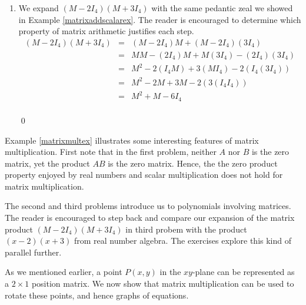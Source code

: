 \documentclass{ximera}
\begin{document}
\begin{example}
\begin{enumerate}
\[\begin{array}{rcl}
\end{array} \]

\item  We expand $\left(M - 2I_4\right)\left(M + 3I_4\right)$ with the same pedantic zeal we showed in Example \ref{matrixaddscalarex}. The reader is encouraged to determine which property of matrix arithmetic justifies each step.
\[\begin{array}{rcl}

\left(M - 2I_4\right)\left(M + 3I_4\right) & = & \left(M - 2I_4\right) M + \left(M - 2I_4\right)\left( 3I_4\right) \\
& = & MM - \left(2I_4\right)M + M\left( 3I_4\right) - \left( 2I_4\right)\left( 3I_4\right) \\
& = & M^2 -2 \left(I_4M\right) +3\left( M I_4\right) - 2\left( I_4\left( 3I_4\right)\right) \\
& = & M^2 - 2M  + 3M - 2\left(3\left( I_4I_4\right)\right) \\
& = & M^2 +M  - 6I_4  \\

\end{array}\]

\qed
\end{enumerate}

\end{example}

Example \ref{matrixmultex} illustrates some interesting features of matrix multiplication.  First note that in the first problem, neither $A$ nor $B$ is the zero matrix, yet the product $AB$ is the zero matrix.  Hence, the the zero product property enjoyed by real numbers and scalar multiplication does not hold for matrix multiplication. 

The second and third problems  introduce us to polynomials involving matrices.  The reader is encouraged to step back and compare our expansion of the matrix product $\left(M - 2I_4\right)\left(M + 3I_4\right)$ in third probem with the product $(x-2)(x+3)$ from real number algebra.  The exercises explore this kind of parallel further.  

\smallskip

As we mentioned earlier, a point $P(x,y)$ in the $xy$-plane can be represented as a $2 \times 1$ position matrix.  We now show that matrix multiplication can be used to rotate these points, and hence graphs of equations.
\end{document}
